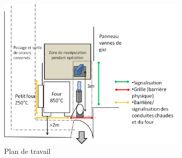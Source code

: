 \begin{figure}[!h]
  \centering
\includegraphics[width=0.8\textwidth]{fig/EPR_plan_de_travail.png}
  \caption{Plan de travail}
 \label{plan_travail}
\end{figure}
\newpage
